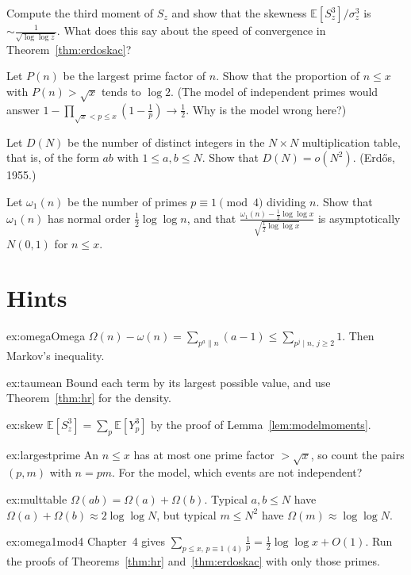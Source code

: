 \begin{exercise}[$\star$]\label{ex:skew}
Compute the third moment of $S_z$ and show that the skewness $\mathbb E[S_z^3]/\sigma_z^3$ is $\sim\frac1{\sqrt{\log\log z}}$. What does this say about the speed of convergence in Theorem~\ref{thm:erdoskac}?
\end{exercise}

\begin{exercise}[$\star\star$]\label{ex:largestprime}
Let $P(n)$ be the largest prime factor of $n$. Show that the proportion of $n\le x$ with $P(n)>\sqrt x$ tends to $\log2$. (The model of independent primes would answer $1-\prod_{\sqrt x<p\le x}(1-\frac1p)\to\frac12$. Why is the model wrong here?)
\end{exercise}

\begin{exercise}\label{ex:multtable}
Let $D(N)$ be the number of distinct integers in the $N\times N$ multiplication table, that is, of the form $ab$ with $1\le a,b\le N$. Show that $D(N)=o(N^2)$. (Erd\H{o}s, 1955.)
\end{exercise}

\begin{exercise}[$\star\star\star$]\label{ex:omega1mod4}
Let $\omega_1(n)$ be the number of primes $p\equiv1\pmod4$ dividing $n$. Show that $\omega_1(n)$ has normal order $\frac12\log\log n$, and that $\frac{\omega_1(n)-\frac12\log\log x}{\sqrt{\frac12\log\log x}}$ is asymptotically $N(0,1)$
for $n\le x$.
\end{exercise}

\section{Hints}

\begin{hint}{ex:omegaOmega}
$\Omega(n)-\omega(n)=\sum_{p^a\|n}(a-1)\le\sum_{p^j\mid n,\,j\ge2}1$. Then Markov's inequality.
\end{hint}
\begin{hint}{ex:taumean}
Bound each term by its largest possible value, and use Theorem~\ref{thm:hr} for the density.
\end{hint}
\begin{hint}{ex:skew}
$\mathbb E[S_z^3]=\sum_p\mathbb E[Y_p^3]$ by the proof of Lemma~\ref{lem:modelmoments}.
\end{hint}
\begin{hint}{ex:largestprime}
An $n\le x$ has at most one prime factor $>\sqrt x$, so count the pairs $(p,m)$ with $n=pm$. For the model, which events are not independent?
\end{hint}
\begin{hint}{ex:multtable}
$\Omega(ab)=\Omega(a)+\Omega(b)$. Typical $a,b\le N$ have $\Omega(a)+\Omega(b)\approx2\log\log N$, but typical $m\le N^2$ have $\Omega(m)\approx\log\log N$.
\end{hint}
\begin{hint}{ex:omega1mod4}
Chapter~4 gives $\sum_{p\le x,\,p\equiv1\,(4)}\frac1p=\frac12\log\log x+O(1)$. Run the proofs of Theorems~\ref{thm:hr} and~\ref{thm:erdoskac} with only those primes.
\end{hint}

